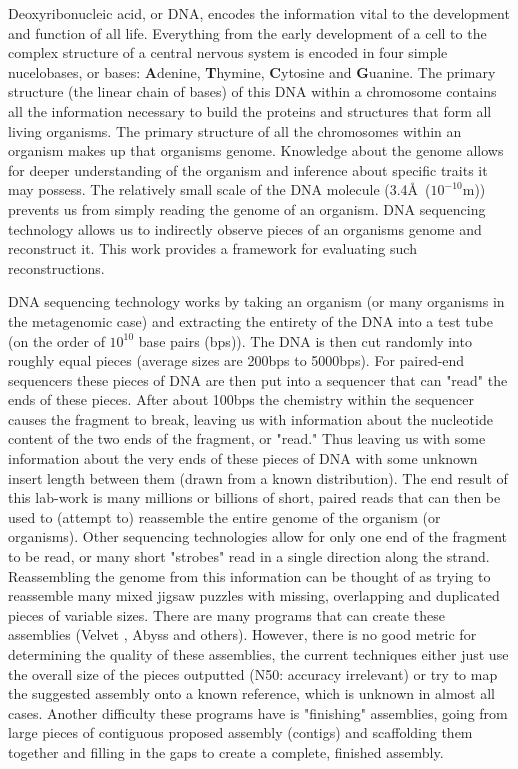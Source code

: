 \documentclass[phd,tocprelim]{cornell}
\begin{document}
Deoxyribonucleic acid, or DNA, encodes the information vital to the development and function of all life. Everything from the early development of a cell to the complex structure of a central nervous system is encoded in four simple nucelobases, or bases: {\bf \color{red} A}denine, {\bf \color{blue} T}hymine, {\bf \color{MyDarkGreen} C}ytosine and {\bf \color{orange} G}uanine. The primary structure (the linear chain of bases) of this DNA within a chromosome contains all the information necessary to build the proteins and structures that form all living organisms. The primary structure of all the chromosomes within an organism makes up that organisms genome. Knowledge about the genome allows for deeper understanding of the organism and inference about specific traits it may possess. The relatively small scale of the DNA molecule (3.4\AA\ ($10^{-10}$m)) prevents us from simply reading the genome of an organism. DNA sequencing technology allows us to indirectly observe pieces of an organisms genome and reconstruct it. This work provides a framework for evaluating such reconstructions.

DNA sequencing technology works by taking an organism (or many organisms in the metagenomic
case) and extracting the entirety of the DNA into a test tube (on the order of $10^{10}$ base pairs (bps)).
The DNA is then cut randomly into roughly equal pieces (average sizes are 200bps to 5000bps). For paired-end sequencers these pieces
of DNA are then put into a sequencer that can "read" the ends of these pieces. After about 100bps the chemistry within the sequencer causes the fragment to break, leaving us with information about the nucleotide content of the two ends of the fragment, or "read."
Thus leaving us with some information about the very ends of these pieces of DNA with some
unknown insert length between them (drawn from a known distribution). The end result of this
lab-work is many millions or billions of short, paired reads that can then be used to (attempt to)
reassemble the entire genome of the organism (or organisms). Other sequencing technologies allow for only one end of the fragment to be read, or many short "strobes" read in a single direction along the strand. Reassembling the genome from this information can be thought of as trying to
reassemble many mixed jigsaw puzzles with missing, overlapping and duplicated pieces of variable
sizes. There are many programs that can create these assemblies (Velvet \cite{Zerbino2008}, Abyss \cite{Simpson2009} and others). However, there
is no good metric for determining the quality of these assemblies, the current techniques either just
use the overall size of the pieces outputted (N50: accuracy irrelevant) or try to map the suggested
assembly onto a known reference, which is unknown in almost all cases. Another difficulty these 
programs have is "finishing" assemblies, going from large pieces of contiguous proposed assembly
(contigs) and scaffolding them together and filling in the gaps to create a complete, finished
assembly.
\end{document}
